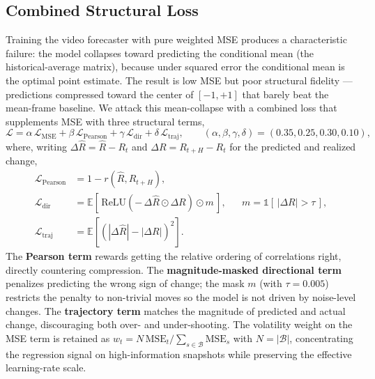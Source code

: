 \documentclass[runningheads]{llncs}
\begin{document}
\subsection{Combined Structural Loss}\label{sec:loss}

Training the video forecaster with pure weighted MSE produces a
characteristic failure: the model collapses toward predicting the
conditional mean (the historical-average matrix), because under squared
error the conditional mean is the optimal point estimate. The result is
low MSE but poor structural fidelity --- predictions compressed toward
the center of $[-1,+1]$ that barely beat the mean-frame baseline. We
attack this mean-collapse with a combined loss that supplements MSE with
three structural terms,
\begin{equation}
    \mathcal{L} = \alpha\,\mathcal{L}_{\text{MSE}}
                + \beta\,\mathcal{L}_{\text{Pearson}}
                + \gamma\,\mathcal{L}_{\text{dir}}
                + \delta\,\mathcal{L}_{\text{traj}},
    \qquad (\alpha,\beta,\gamma,\delta) = (0.35, 0.25, 0.30, 0.10),
\end{equation}
where, writing $\Delta\hat{R} = \hat{R}-R_t$ and
$\Delta R = R_{t+H}-R_t$ for the predicted and realized change,
\begin{align}
    \mathcal{L}_{\text{Pearson}}
        &= 1 - r(\hat{R}, R_{t+H}), \\
    \mathcal{L}_{\text{dir}}
        &= \mathbb{E}\!\left[\,
           \mathrm{ReLU}\!\left(-\,\Delta\hat{R}\odot\Delta R\right)
           \odot m \,\right],
        && m = \mathbb{1}\!\left[\,|\Delta R| > \tau\,\right], \\
    \mathcal{L}_{\text{traj}}
        &= \mathbb{E}\!\left[\left(|\Delta\hat{R}| - |\Delta R|\right)^2\right].
\end{align}
The \textbf{Pearson term} rewards getting the relative ordering of
correlations right, directly countering compression. The
\textbf{magnitude-masked directional term} penalizes predicting the
wrong sign of change; the mask $m$ (with $\tau = 0.005$) restricts the
penalty to non-trivial moves so the model is not driven by noise-level
changes. The \textbf{trajectory term} matches the magnitude of predicted
and actual change, discouraging both over- and under-shooting. The
volatility weight on the MSE term is retained as
$w_t = N\,\text{MSE}_t / \sum_{s \in \mathcal{B}} \text{MSE}_s$ with
$N = |\mathcal{B}|$, concentrating the regression signal on
high-information snapshots while preserving the effective learning-rate
scale.
\end{document}
